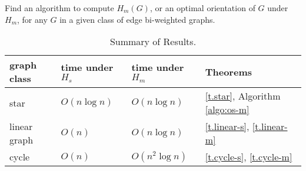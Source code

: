 \begin{problem}
Find an algorithm to compute
$H_m(G) $, or an optimal orientation of $G$ under $H_m$,
for any $G$ in a given class of edge bi-weighted graphs.
\end{problem}

\begin{table*}[h!]
	\begin{center}
		\caption{Summary of Results.}
		\label{tbl:summary}
		\begin{tabular}{|l|l|l|l|}
			\hline
			graph class & time under $H_s$ & time under $H_m$  & Theorems  \\
			\hline
			star            &        $O(n \log n)$  & $O(n \log n)$        & \ref{t.star}, Algorithm \ref{algo:os-m}	\\
						\hline
			linear graph & $O(n)$        		&$O(n \log n)$ 	& \ref{t.linear-s}, \ref{t.linear-m} \\
						\hline
			cycle 		 & $O(n)$ 		& $O(n^2 \log n)$ 		&  \ref{t.cycle-s}, \ref{t.cycle-m} \\

			\hline
		\end{tabular}
	\end{center}
\end{table*}
